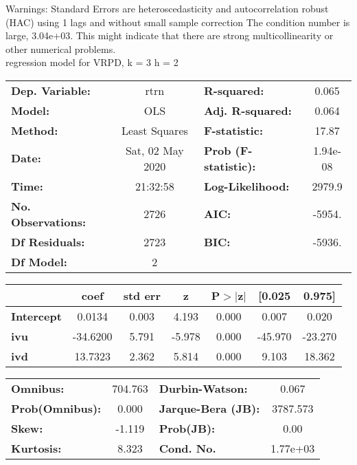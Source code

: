 Warnings: \newline
 [1] Standard Errors are heteroscedasticity and autocorrelation robust (HAC) using 1 lags and without small sample correction \newline
 [2] The condition number is large, 3.04e+03. This might indicate that there are \newline
 strong multicollinearity or other numerical problems.\\ 

regression model for VRPD, k = 3 h = 2\begin{center}
\begin{tabular}{lclc}
\toprule
\textbf{Dep. Variable:}    &       rtrn       & \textbf{  R-squared:         } &     0.065   \\
\textbf{Model:}            &       OLS        & \textbf{  Adj. R-squared:    } &     0.064   \\
\textbf{Method:}           &  Least Squares   & \textbf{  F-statistic:       } &     17.87   \\
\textbf{Date:}             & Sat, 02 May 2020 & \textbf{  Prob (F-statistic):} &  1.94e-08   \\
\textbf{Time:}             &     21:32:58     & \textbf{  Log-Likelihood:    } &    2979.9   \\
\textbf{No. Observations:} &        2726      & \textbf{  AIC:               } &    -5954.   \\
\textbf{Df Residuals:}     &        2723      & \textbf{  BIC:               } &    -5936.   \\
\textbf{Df Model:}         &           2      & \textbf{                     } &             \\
\bottomrule
\end{tabular}
\begin{tabular}{lcccccc}
                   & \textbf{coef} & \textbf{std err} & \textbf{z} & \textbf{P$> |$z$|$} & \textbf{[0.025} & \textbf{0.975]}  \\
\midrule
\textbf{Intercept} &       0.0134  &        0.003     &     4.193  &         0.000        &        0.007    &        0.020     \\
\textbf{ivu}       &     -34.6200  &        5.791     &    -5.978  &         0.000        &      -45.970    &      -23.270     \\
\textbf{ivd}       &      13.7323  &        2.362     &     5.814  &         0.000        &        9.103    &       18.362     \\
\bottomrule
\end{tabular}
\begin{tabular}{lclc}
\textbf{Omnibus:}       & 704.763 & \textbf{  Durbin-Watson:     } &    0.067  \\
\textbf{Prob(Omnibus):} &   0.000 & \textbf{  Jarque-Bera (JB):  } & 3787.573  \\
\textbf{Skew:}          &  -1.119 & \textbf{  Prob(JB):          } &     0.00  \\
\textbf{Kurtosis:}      &   8.323 & \textbf{  Cond. No.          } & 1.77e+03  \\
\bottomrule
\end{tabular}
\end{center}

